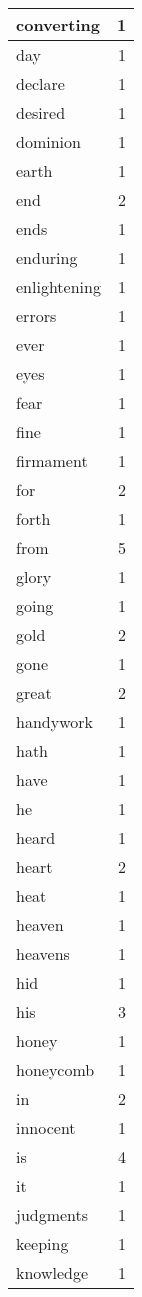 \begin{center}
\begin{longtable}{l|r}
converting & 1 \\ \hline
day & 1 \\ \hline
declare & 1 \\ \hline
desired & 1 \\ \hline
dominion & 1 \\ \hline
earth & 1 \\ \hline
end & 2 \\ \hline
ends & 1 \\ \hline
enduring & 1 \\ \hline
enlightening & 1 \\ \hline
errors & 1 \\ \hline
ever & 1 \\ \hline
eyes & 1 \\ \hline
fear & 1 \\ \hline
fine & 1 \\ \hline
firmament & 1 \\ \hline
for & 2 \\ \hline
forth & 1 \\ \hline
from & 5 \\ \hline
glory & 1 \\ \hline
going & 1 \\ \hline
gold & 2 \\ \hline
gone & 1 \\ \hline
great & 2 \\ \hline
handywork & 1 \\ \hline
hath & 1 \\ \hline
have & 1 \\ \hline
he & 1 \\ \hline
heard & 1 \\ \hline
heart & 2 \\ \hline
heat & 1 \\ \hline
heaven & 1 \\ \hline
heavens & 1 \\ \hline
hid & 1 \\ \hline
his & 3 \\ \hline
honey & 1 \\ \hline
honeycomb & 1 \\ \hline
in & 2 \\ \hline
innocent & 1 \\ \hline
is & 4 \\ \hline
it & 1 \\ \hline
judgments & 1 \\ \hline
keeping & 1 \\ \hline
knowledge & 1 \\ \hline

\end{longtable}
\end{center}
